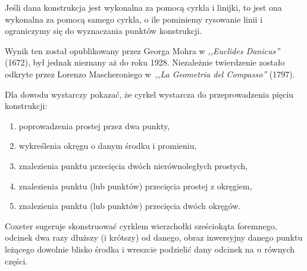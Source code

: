 %

\begin{theorem}
    Jeśli dana konstrukcja jest wykonalna za pomocą cyrkla i linijki, to jest ona wykonalna za pomocą samego cyrkla, o ile pominiemy rysowanie linii i ograniczymy się do wyznaczania punktów konstrukcji.
\end{theorem}

Wynik ten został opublikowany przez Georga Mohra w \emph{,,Euclides Danicus''} (1672), był jednak nieznany aż do roku 1928. %
Niezależnie twierdzenie zostało odkryte przez Lorenzo Mascheroniego w~\emph{,,La Geometria del Compasso''} (1797).
%
%

Dla dowodu wystarczy pokazać, że cyrkel wystarcza do przeprowadzenia pięciu konstrukcji:
\begin{enumerate}
    \item poprowadzenia prostej przez dwa punkty,
    \item wykreślenia okręgu o danym środku i promieniu,
    \item znalezienia punktu przecięcia dwóch nierównoległych prostych,
    \item znalezienia punktu (lub punktów) przecięcia prostej z okręgiem,
    \item znalezienia punktu (lub punktów) przecięcia dwóch okręgów.
\end{enumerate}

Coxeter \cite[s. 95]{coxeter_1967} sugeruje skonstruować cyrklem wierzchołki sześciokąta foremnego, odcinek dwa razy dłuższy (i krótszy) od danego, obraz inwersyjny danego punktu leżącego dowolnie blisko środka i wreszcie podzielić dany odcinek na $n$ równych części.

%